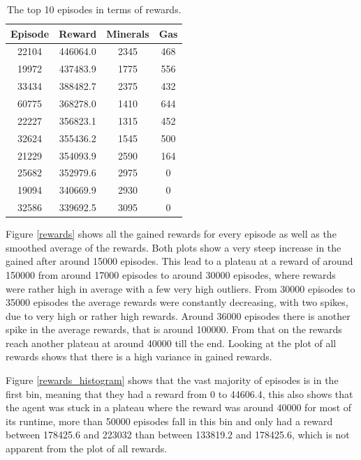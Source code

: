 \documentclass{article}
\begin{document}
\begin{table}
\begin{tabular}{|c|c|c|c|}
\hline
Episode & Reward & Minerals & Gas\\
\hline
22104 & 446064.0 & 2345 & 468\\
19972 & 437483.9 & 1775 & 556\\
33434 & 388482.7 & 2375 & 432\\
60775 & 368278.0 & 1410 & 644\\
22227 & 356823.1 & 1315 & 452\\
32624 &  355436.2 & 1545 & 500\\
21229 &  354093.9 & 2590 & 164\\
25682 &  352979.6 & 2975 & 0\\
19094 & 340669.9 & 2930 & 0\\
32586 & 339692.5 & 3095 & 0\\
\hline
\end{tabular}
\caption{The top 10 episodes in terms of rewards.}
\label{rewards_table}
\end{table}

Figure \ref{rewards} shows all the gained rewards for every episode as well as 
the smoothed average of the rewards. Both plots show a very steep increase in 
the gained after around 15000 episodes. This lead to a plateau at a reward of 
around 150000 from around 17000 episodes to around 30000 episodes, where 
rewards were rather high in average with a few very high outliers. From 30000 
episodes to 35000 episodes the average rewards were constantly decreasing, with 
two spikes, due to very high or rather high rewards. Around 36000 episodes 
there is another spike in the average rewards, that is around 100000. From that 
on the rewards reach another plateau at around 40000 till the end. Looking at 
the plot of all rewards shows that there is a high variance in gained rewards.

Figure \ref{rewards_histogram} shows that the vast majority of episodes is in 
the first bin, meaning that they had a reward from 0 to 44606.4, this also 
shows that the agent was stuck in a plateau where the reward was around 40000 
for most of its runtime, more than 50000 episodes fall in this bin and only 
had a reward between 178425.6 and 223032 than between 133819.2 and 178425.6, 
which is not apparent from the plot of all rewards.
\end{document}
